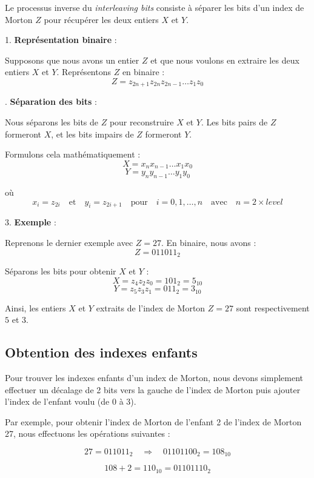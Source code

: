 Le processus inverse du \textit{interleaving bits} consiste à séparer les bits d'un index de Morton \( Z \) pour récupérer les deux entiers \( X \) et \( Y \).

1. \textbf{Représentation binaire} :

   Supposons que nous avons un entier \( Z \) et que nous voulons en extraire les deux entiers \( X \) et \( Y \). Représentons \( Z \) en binaire :
   \[
   Z = z_{2n+1} z_{2n} z_{2n-1} \ldots z_1 z_0
   \]

   . \textbf{Séparation des bits} :

   Nous séparons les bits de \( Z \) pour reconstruire \( X \) et \( Y \). Les bits pairs de \( Z \) formeront \( X \), et les bits impairs de \( Z \) formeront \( Y \).

   Formulons cela mathématiquement :
   \[
   X = x_n x_{n-1} \ldots x_1 x_0
   \]
   \[
   Y = y_n y_{n-1} \ldots y_1 y_0
   \]

   où
   \[
   x_i = z_{2i} \quad \text{et} \quad y_i = z_{2i+1} \quad \text{pour} \quad i = 0, 1, \ldots, n \quad \text{avec} \quad n = 2 \times {level}
   \]

3. \textbf{Exemple} :

   Reprenons le dernier exemple avec \( Z = 27 \). En binaire, nous avons :
   \[
   Z = 011011_2
   \]

   Séparons les bits pour obtenir \( X \) et \( Y \) :
   \[
   X = z_{4}z_{2}z_{0} = 101_2 = 5_{10}
   \]
   \[
   Y = z_{5}z_{3}z_{1} = 011_2 = 3_{10}
   \]

Ainsi, les entiers \( X \) et \( Y \) extraits de l'index de Morton \( Z = 27 \) sont respectivement \( 5 \) et \( 3 \).

\subsection*{Obtention des indexes enfants}

Pour trouver les indexes enfants d'un index de Morton, nous devons simplement effectuer un décalage de 2 bits vers la gauche de l'index de Morton puis ajouter l'index de l'enfant voulu (de 0 à 3).

Par exemple, pour obtenir l'index de Morton de l'enfant 2 de l'index de Morton 27, nous effectuons les opérations suivantes :

\[
27 = 011011_2 \quad \Rightarrow \quad 01101100_2 = 108_{10}
\]

\[
108 + 2 = 110_{10} = 01101110_2
\]

